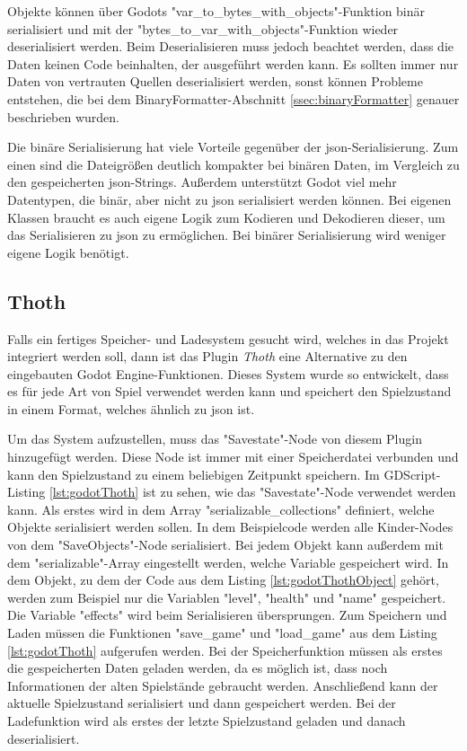 Objekte können über Godots "var\_to\_bytes\_with\_objects"-Funktion binär serialisiert und mit der "bytes\_to\_var\_with\_objects"-Funktion wieder deserialisiert werden. Beim Deserialisieren muss jedoch beachtet werden, dass die Daten keinen Code beinhalten, der ausgeführt werden kann. Es sollten immer nur Daten von vertrauten Quellen deserialisiert werden, sonst können Probleme entstehen, die bei dem BinaryFormatter-Abschnitt \ref{ssec:binaryFormatter} genauer beschrieben wurden.\cite{godotengineGlobalScope}

Die binäre Serialisierung hat viele Vorteile gegenüber der \ac{json}-Serialisierung. Zum einen sind die Dateigrößen deutlich kompakter bei binären Daten, im Vergleich zu den gespeicherten \ac{json}-Strings. Außerdem unterstützt Godot viel mehr Datentypen, die binär, aber nicht zu \ac{json} serialisiert werden können. Bei eigenen Klassen braucht es auch eigene Logik zum Kodieren und Dekodieren dieser, um das Serialisieren zu \ac{json} zu ermöglichen. Bei binärer Serialisierung wird weniger eigene Logik benötigt.\cite{godotengineSavingGames}



\subsection{Thoth}
Falls ein fertiges Speicher- und Ladesystem gesucht wird, welches in das Projekt integriert werden soll, dann ist das Plugin \textit{Thoth} eine Alternative zu den eingebauten Godot Engine-Funktionen. Dieses System wurde so entwickelt, dass es für jede Art von Spiel verwendet werden kann und speichert den Spielzustand in einem Format, welches ähnlich zu \ac{json} ist.\cite{stupidratstudioGodotSaveLoad}

Um das System aufzustellen, muss das "Savestate"-Node von diesem Plugin hinzugefügt werden. Diese Node ist immer mit einer Speicherdatei verbunden und kann den Spielzustand zu einem beliebigen Zeitpunkt speichern. Im GDScript-Listing \ref{lst:godotThoth} ist zu sehen, wie das "Savestate"-Node verwendet werden kann. Als erstes wird in dem Array "serializable\_collections" definiert, welche Objekte serialisiert werden sollen. In dem Beispielcode werden alle Kinder-Nodes von dem "SaveObjects"-Node serialisiert. Bei jedem Objekt kann außerdem mit dem "serializable"-Array eingestellt werden, welche Variable gespeichert wird. In dem Objekt, zu dem der Code aus dem Listing \ref{lst:godotThothObject} gehört, werden zum Beispiel nur die Variablen "level", "health" und "name" gespeichert. Die Variable "effects" wird beim Serialisieren übersprungen. Zum Speichern und Laden müssen die Funktionen "save\_game" und "load\_game" aus dem Listing \ref{lst:godotThoth} aufgerufen werden. Bei der Speicherfunktion müssen als erstes die gespeicherten Daten geladen werden, da es möglich ist, dass noch Informationen der alten Spielstände gebraucht werden. Anschließend kann der aktuelle Spielzustand serialisiert und dann gespeichert werden. Bei der Ladefunktion wird als erstes der letzte Spielzustand geladen und danach deserialisiert.\cite{stupidratstudioGodotSaveLoad} 


